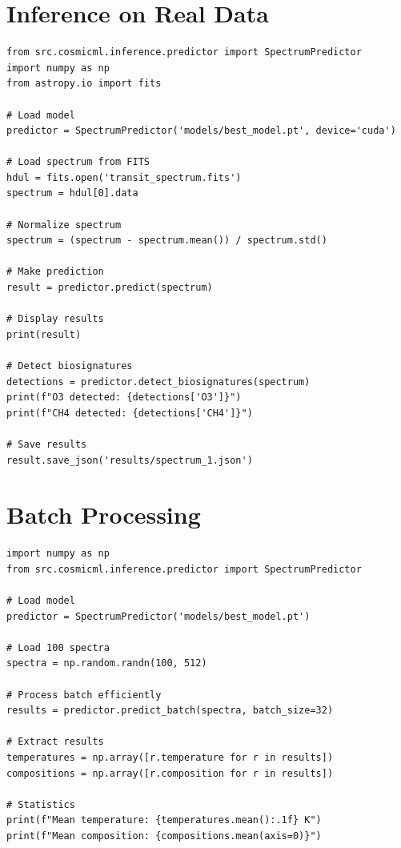 \documentclass[12pt,a4paper,oneside]{report}
\begin{document}
\section{Inference on Real Data}

\begin{lstlisting}
from src.cosmicml.inference.predictor import SpectrumPredictor
import numpy as np
from astropy.io import fits

# Load model
predictor = SpectrumPredictor('models/best_model.pt', device='cuda')

# Load spectrum from FITS
hdul = fits.open('transit_spectrum.fits')
spectrum = hdul[0].data

# Normalize spectrum
spectrum = (spectrum - spectrum.mean()) / spectrum.std()

# Make prediction
result = predictor.predict(spectrum)

# Display results
print(result)

# Detect biosignatures
detections = predictor.detect_biosignatures(spectrum)
print(f"O3 detected: {detections['O3']}")
print(f"CH4 detected: {detections['CH4']}")

# Save results
result.save_json('results/spectrum_1.json')
\end{lstlisting}

\section{Batch Processing}

\begin{lstlisting}
import numpy as np
from src.cosmicml.inference.predictor import SpectrumPredictor

# Load model
predictor = SpectrumPredictor('models/best_model.pt')

# Load 100 spectra
spectra = np.random.randn(100, 512)

# Process batch efficiently
results = predictor.predict_batch(spectra, batch_size=32)

# Extract results
temperatures = np.array([r.temperature for r in results])
compositions = np.array([r.composition for r in results])

# Statistics
print(f"Mean temperature: {temperatures.mean():.1f} K")
print(f"Mean composition: {compositions.mean(axis=0)}")
\end{lstlisting}
\end{document}
